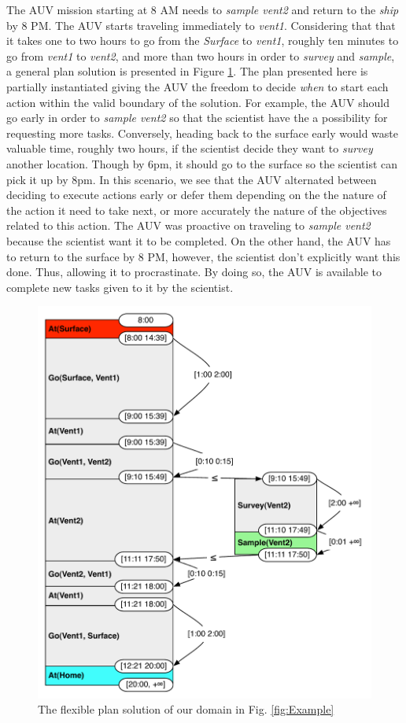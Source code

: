 The AUV mission starting at 8 AM needs to {\em sample vent2}
and return to the {\em ship} by 8 PM. The AUV starts traveling immediately
to {\em vent1}. Considering that that it takes one to two hours
to go from the {\em Surface} to {\em vent1},  roughly ten minutes
to go from {\em vent1} to {\em vent2}, and more than two hours in order
to {\em survey} and {\em sample}, a general plan solution is presented in Figure
\ref{fig:ex:plan}. The plan presented here is partially instantiated
giving the AUV the freedom to decide {\em when} to start each action within
the valid boundary of the solution. For example, the AUV should go
early in order to {\em sample vent2} so that the scientist have the a possibility for requesting 
more tasks. Conversely, heading back to the surface early would waste valuable
time, roughly two hours, if the scientist decide they want to {\em survey} another location. Though by 6pm, it should
go to the surface so the scientist can pick it up by 8pm. In this scenario,
we see that the AUV alternated between deciding to execute actions
early or defer them depending on the the nature of the action it
need to take next, or more accurately the nature of the objectives 
related to this action. The AUV was proactive on traveling to {\em sample vent2} because the
scientist want it to be completed. On the other hand, the AUV has to return to the surface by
8 PM, however, the scientist don't explicitly want this done. Thus, allowing it to procrastinate. 
By doing so, the AUV is available to complete new tasks given to it by the scientist. 


\begin{figure}
  \centering
  \includegraphics[width=0.8\columnwidth]{figs/example_plan}
  \caption{The flexible plan solution of our domain in
    Fig. \ref{fig:Example}}
  \label{fig:ex:plan}
\end{figure}

